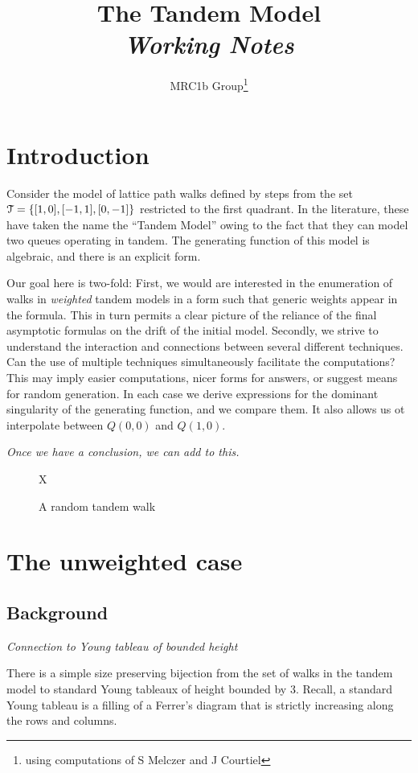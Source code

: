 \documentclass[11pt]{article}
\author{MRC1b Group\footnote{using computations of S Melczer and J Courtiel}}
\title{{\sc The Tandem Model}\\{\sl \color{gray}Working Notes}}
\newcommand\mjm[1]{\mbox{}
{\marginpar{\color{red!50}$\EuScript{M}$}}
{\it\noindent\color{red!50}#1}}%
\newcommand{\cT}{\EuScript{T}}
\begin{document}
\maketitle

\section{Introduction}
Consider the model of lattice path walks defined by steps from the set
$\cT=\{ [1,0], [-1,1], [0,-1] \}$ restricted to the first quadrant. In
the literature, these have taken the name the ``Tandem Model'' owing
to the fact that they can model two queues operating in tandem. 
The generating function of this model is algebraic, and there is an
explicit form. 

Our goal here is two-fold: First, we would are interested in the
enumeration of walks in {\it weighted\/} tandem models in a form such
that generic weights appear in the formula. This in turn permits a
clear picture of the reliance of the final asymptotic formulas on the
drift of the initial model. Secondly, we strive to understand the
interaction and connections between several different techniques. Can
the use of multiple techniques simultaneously facilitate the
computations? This may imply easier computations, nicer forms for
answers, or suggest means for random generation. In each case we
derive expressions for the dominant singularity of the generating
function, and we compare them. It also allows us ot interpolate
between $Q(0,0)$ and $Q(1,0)$.

\mjm{Once we have a conclusion, we can add to this.}
\begin{figure}\center
{\Huge X}
\caption{A random tandem walk}
\end{figure}
\section{The unweighted case}
\subsection{Background}
\mjm{Connection to Young tableau of bounded height}

There is a simple size preserving bijection from the set of walks in
the tandem model to standard Young tableaux of height bounded by 3.
Recall, a standard Young tableau is a filling of a Ferrer's diagram
that is strictly increasing along the rows and columns.
\end{document}

